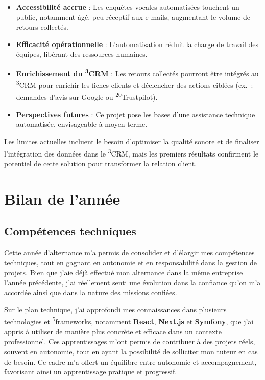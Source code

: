 \begin{itemize}
    \item \textbf{Accessibilité accrue} : Les enquêtes vocales automatisées touchent un public, notamment âgé, peu réceptif aux e-mails, augmentant le volume de retours collectés.\vspace{0.3cm}
    \item \textbf{Efficacité opérationnelle} : L’automatisation réduit la charge de travail des équipes, libérant des ressources humaines.\vspace{0.3cm}
    \item \textbf{Enrichissement du \textsuperscript{3}CRM} : Les retours collectés pourront être intégrés au \textsuperscript{3}CRM pour enrichir les fiches clients et déclencher des actions ciblées (ex.~: demandes d’avis sur Google ou \textsuperscript{20}Trustpilot).\vspace{0.3cm}
    \item \textbf{Perspectives futures} : Ce projet pose les bases d’une assistance technique automatisée, envisageable à moyen terme.\vspace{0.3cm}
\end{itemize}

Les limites actuelles incluent le besoin d’optimiser la qualité sonore et de finaliser l’intégration des données dans le \textsuperscript{3}CRM, mais les premiers résultats confirment le potentiel de cette solution pour transformer la relation client.






\section{Bilan de l’année}
\label{bilan}

\subsection{Compétences techniques}

Cette année d’alternance m’a permis de consolider et d’élargir mes compétences techniques, tout en gagnant en autonomie et en responsabilité dans la gestion de projets. Bien que j’aie déjà effectué mon alternance dans la même entreprise l’année précédente, j’ai réellement senti une évolution dans la confiance qu’on m’a accordée ainsi que dans la nature des missions confiées.

Sur le plan technique, j’ai approfondi mes connaissances dans plusieurs technologies et \textsuperscript{5}frameworks, notamment \textbf{React}, \textbf{Next.js} et \textbf{Symfony}, que j’ai appris à utiliser de manière plus concrète et efficace dans un contexte professionnel. Ces apprentissages m’ont permis de contribuer à des projets réels, souvent en autonomie, tout en ayant la possibilité de solliciter mon tuteur en cas de besoin. Ce cadre m’a offert un équilibre entre autonomie et accompagnement, favorisant ainsi un apprentissage pratique et progressif.

